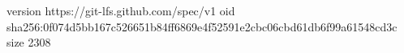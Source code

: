 version https://git-lfs.github.com/spec/v1
oid sha256:0f074d5bb167c526651b84ff6869e4f52591e2cbc06cbd61db6f99a61548cd3c
size 2308
